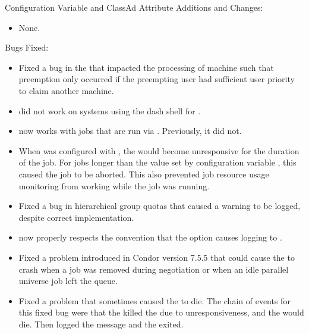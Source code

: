 \noindent Configuration Variable and ClassAd Attribute Additions and Changes:

\begin{itemize}

\item None.

\end{itemize}

\noindent Bugs Fixed:

\begin{itemize}

\item Fixed a bug in the  that impacted the processing 
of machine  such that  
preemption only occurred if the preempting user had sufficient user priority 
to claim another machine. 

\item {} did not work on systems using the 
dash shell for .

\item {} now works with jobs that are run via 
. Previously, it did not. 

\item When  was configured with ,
the  would become unresponsive for the duration of the job. 
For jobs longer than the value set by configuration variable
,
this caused the job to be aborted. 
This also prevented job resource usage monitoring from working 
while the job was running.

\item Fixed a bug in hierarchical group quotas that caused 
a warning to be logged, despite correct implementation.

\item {} now properly respects the convention that
the  option causes  logging to . 

\item Fixed a problem introduced in Condor version 7.5.5 
that could cause the  to crash when a job was removed 
during negotiation or when an idle parallel universe job left the queue. 

\item Fixed a problem that sometimes caused the  to die.
The chain of events for this fixed bug were that
the  killed the  due to unresponsiveness,
and the  would die.
Then  logged the message
 and the  exited. 


\end{itemize}
